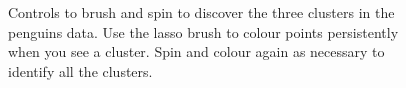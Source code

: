 \documentclass[
  letterpaper,
]{book}
\begin{document}
\begin{figure}

{\centering 

}

\caption{\label{fig-penguins-brush-and-spin}Controls to brush and spin
to discover the three clusters in the penguins data. Use the lasso brush
to colour points persistently when you see a cluster. Spin and colour
again as necessary to identify all the clusters.}

\end{figure}

\begin{figure}

\begin{minipage}[t]{0.50\linewidth}

{\centering 


}

\subcaption{\label{fig-penguins-bs1}}
\end{minipage}%
%
\begin{minipage}[t]{0.50\linewidth}

{\centering 

}
\end{minipage}
\end{figure}
\end{document}
